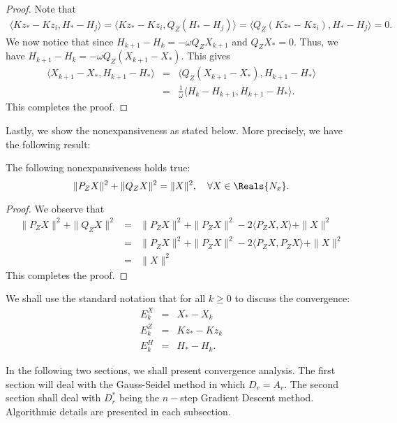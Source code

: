 \begin{proof}
Note that 
\begin{eqnarray*} 
\langle Kz_* - Kz_i, H_* - H_j \rangle = \langle Kz_* - Kz_i, Q_Z(H_* - H_j) \rangle = \langle Q_Z(Kz_* - Kz_i), H_* - H_j \rangle = 0.   
\end{eqnarray*} 
We now notice that since $H_{k+1} - H_k = -\omega Q_ZX_{k+1}$ and $Q_ZX_* = 0.$ Thus, we have $H_{k+1} - H_k = -\omega Q_Z(X_{k+1} - X_*).$ This gives 
\begin{eqnarray*} 
\langle X_{k+1} - X_*, H_{k+1} - H_* \rangle &=& \langle Q_Z(X_{k+1} - X_*), H_{k+1} - H_* \rangle \\
&=& \frac{1}{\omega} \langle H_{k} - H_{k+1}, H_{k+1} - H_* \rangle.    
\end{eqnarray*} 
This completes the proof. 
\end{proof}
Lastly, we show the nonexpansiveness as stated below. More precisely, we have the following result: 
\begin{lemma}
The following nonexpansiveness holds true: 
\begin{equation}
\|P_ZX\|^2 + \|Q_ZX\|^2 = \| X\|^2, \quad \forall X \in \Reals{N_x}. 
\end{equation}
\end{lemma}

\begin{proof}
We observe that 
\begin{eqnarray*}
\|P_Z X\|^2 + \|Q_Z X \|^2 &=& \|P_Z X \|^2 + \|P_Z X \|^2 - 2 \langle P_Z X, X \rangle + \|X\|^2 \\
&=& \|P_Z X\|^2 + \|P_Z X \|^2 - 2 \langle P_ZX, P_ZX \rangle + \|X\|^2 \\
&=& \| X\|^2
\end{eqnarray*}
This completes the proof. 
\end{proof}
We shall use the standard notation that for all $k \geq 0$ to discuss the convergence:  
\begin{eqnarray*}
E_k^X &=& X_* - X_k \\
E_k^Z &=& Kz_* - Kz_k \\ 
E_k^H &=& H_* - H_k. 
\end{eqnarray*}

In the following two sections, we shall present convergence analysis. The first section will deal with the Gauss-Seidel method in which $D_r = A_r$. The second section shall deal with $D_r^*$ being the $n-$step Gradient Descent method. Algorithmic details are presented in each subsection.  

